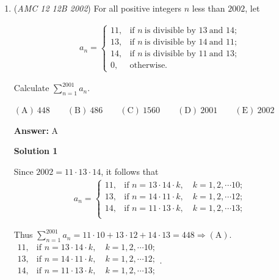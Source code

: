 \begin{enumerate}
 -jb2015007

 


	\item (\textit{AMC 12 12B 2002}) For all positive integers $n$ less than $2002$, let 


 
 \begin{eqnarray*} a_n =\left\{ \begin{array}{lr} 11, & \text{if\ }n\ \text{is\ divisible\ by\ }13\ \text{and\ }14;\\ 13, & \text{if\ }n\ \text{is\ divisible\ by\ }14\ \text{and\ }11;\\ 14, & \text{if\ }n\ \text{is\ divisible\ by\ }11\ \text{and\ }13;\\ 0, & \text{otherwise}. \end{array} \right. \end{eqnarray*}


 Calculate $\sum_{n=1}^{2001} a_n$.


 $\mathrm{(A)}\ 448 \qquad\mathrm{(B)}\ 486 \qquad\mathrm{(C)}\ 1560 \qquad\mathrm{(D)}\ 2001 \qquad\mathrm{(E)}\ 2002$

 \textbf{Answer: }A



\textbf{Solution 1}

Since $2002 = 11 \cdot 13 \cdot 14$, it follows that 
 \begin{eqnarray*} a_n =\left\{ \begin{array}{lr} 11, & \text{if\ }n=13 \cdot 14 \cdot k, \quad k = 1,2,\cdots 10;\\ 13, & \text{if\ }n=14 \cdot 11 \cdot k, \quad k = 1,2,\cdots 12;\\ 14, & \text{if\ }n=11 \cdot 13 \cdot k, \quad k = 1,2,\cdots 13;\\ \end{array} \right. \end{eqnarray*}

 Thus $\sum_{n=1}^{2001} a_n = 11 \cdot 10 + 13 \cdot 12 + 14 \cdot 13 = 448 \Rightarrow \mathrm{(A)}$.$\begin{array}{lr} 11, & \text{if\ }n=13 \cdot 14 \cdot k, \quad k = 1,2,\cdots 10;\\ 13, & \text{if\ }n=14 \cdot 11 \cdot k, \quad k = 1,2,\cdots 12;\\ 14, & \text{if\ }n=11 \cdot 13 \cdot k, \quad k = 1,2,\cdots 13;\\ \end{array}$.

 




\end{enumerate}
